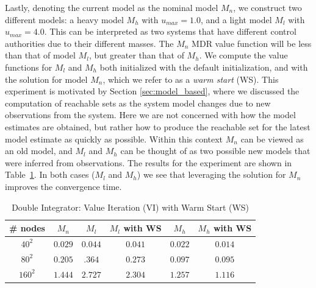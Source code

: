 Lastly, denoting the current model as the nominal model $M_n$, we construct two different models: a heavy model $M_h$ with $u_{max}=1.0$, and a light model $M_l$ with $u_{max}=4.0$. This can be interpreted as two systems that have different control authorities due to their different masses. The $M_n$ MDR value function will be less than that of model $M_l$, but greater than that of $M_h$. We compute the value functions for $M_l$ and $M_h$ both initialized with the default initialization, and with the solution for model $M_n$, which we refer to as a \emph{warm start} (WS). This experiment is motivated by Section \ref{sec:model_based}, where we discussed the computation of reachable sets as the system model changes due to new observations from the system. Here we are not concerned with how the model estimates are obtained, but rather how to produce the reachable set for the latest model estimate as quickly as possible. Within this context $M_n$ can be viewed as an old model, and $M_l$ and $M_h$ can be thought of as two possible new models that were inferred from observations. The results for the experiment are shown in Table~\ref{tab:ws_di}. In both cases ($M_l$ and $M_h$) we see that leveraging the solution for $M_n$ improves the convergence time.

\begin{table}
\centering
\caption{Double Integrator: Value Iteration (VI) with Warm Start (WS)}
\label{tab:ws_di}
\begin{tabular}{|c| c| c| c| c| c|}
\hline
\# nodes & $M_n$ & $M_l$ &  $M_l$ with WS & $M_h$ & $M_h$ with WS \\ \hline
$40^2$ & $0.029$ & $0.044$ & $0.041$ & $0.022$ & $0.014$\\ \hline
$80^2$ & $0.205$ & $.364$ & $0.273$ & $0.097$ & $0.095$\\ \hline
$160^2$ & $1.444$ & $2.727$ & $2.304$ & $1.257$ & $1.116$\\ \hline
\end{tabular}
\end{table}



